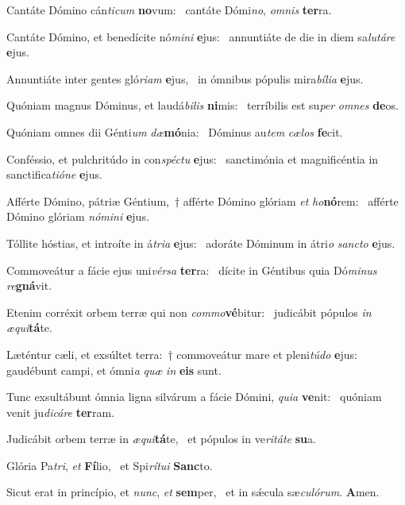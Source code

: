 \item Cantáte Dómino cán\textit{ticum} \textbf{no}vum:~\psstar{} cantáte Dómi\textit{no}, \textit{omnis} \textbf{ter}ra.
\item Cantáte Dómino, et benedícite nó\textit{mini} \textbf{e}jus:~\psstar{} annuntiáte de die in diem sa\textit{lutáre} \textbf{e}jus.
\item Annuntiáte inter gentes gló\textit{riam} \textbf{e}jus,~\psstar{} in ómnibus pópulis mira\textit{bília} \textbf{e}jus.
\item Quóniam magnus Dóminus, et laudá\textit{bilis} \textbf{ni}mis:~\psstar{} terríbilis est su\textit{per} \textit{omnes} \textbf{de}os.
\item Quóniam omnes dii Génti\textit{um} \textit{dæ}\textbf{mó}nia:~\psstar{} Dóminus au\textit{tem} \textit{cælos} \textbf{fe}cit.
\item Conféssio, et pulchritúdo in con\textit{spéctu} \textbf{e}jus:~\psstar{} sanctimónia et magnificéntia in sanctifica\textit{tióne} \textbf{e}jus.
\item Afférte Dómino, pátriæ Géntium,~† afférte Dómino glóriam \textit{et} \textit{ho}\textbf{nó}rem:~\psstar{} afférte Dómino glóriam \textit{nómini} \textbf{e}jus.
\item Tóllite hóstias, et introíte in á\textit{tria} \textbf{e}jus:~\psstar{} adoráte Dóminum in átri\textit{o} \textit{sancto} \textbf{e}jus.
\item Commoveátur a fácie ejus uni\textit{vérsa} \textbf{ter}ra:~\psstar{} dícite in Géntibus quia Dó\textit{minus} \textit{re}\textbf{gná}vit.
\item Etenim corréxit orbem terræ qui non \textit{commo}\textbf{vé}bitur:~\psstar{} judicábit pópulos \textit{in} \textit{æqui}\textbf{tá}te.
\item Læténtur cæli, et exsúltet terra:~† commoveátur mare et pleni\textit{túdo} \textbf{e}jus:~\psstar{} gaudébunt campi, et ómni\textit{a} \textit{quæ} \textit{in} \textbf{e}\textbf{is} sunt.
\item Tunc exsultábunt ómnia ligna silvárum a fácie Dómini, \textit{quia} \textbf{ve}nit:~\psstar{} quóniam venit ju\textit{dicáre} \textbf{ter}ram.
\item Judicábit orbem terræ in \textit{æqui}\textbf{tá}te,~\psstar{} et pópulos in ve\textit{ritáte} \textbf{su}a.
\item Glória Pa\textit{tri}, \textit{et} \textbf{Fí}lio,~\psstar{} et Spi\textit{rítui} \textbf{Sanc}to.
\item Sicut erat in princípio, et \textit{nunc}, \textit{et} \textbf{sem}per,~\psstar{} et in sǽcula sæ\textit{culórum}. \textbf{A}men.
